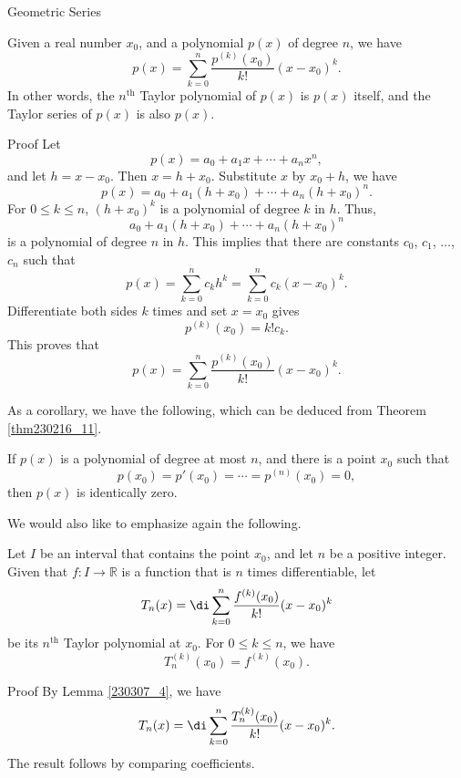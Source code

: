 \begin{example}[label=230305_16]{Geometric Series}
\begin{example}[label=230304_9]{}
\begin{example}{}
\begin{lemma}[label=230307_4]{}
Given a real number $x_0$, and a polynomial $p(x)$ of degree $n$, we have
\[p(x)=\sum_{k=0}^n\frac{p^{(k)}(x_0)}{k!}(x-x_0)^k.\]In other words, the $n^{\text{th}}$ Taylor polynomial of $p(x)$ is $p(x)$ itself, and the Taylor series of $p(x)$ is also $p(x)$.
\end{lemma}
\begin{myproof}{Proof}
Let
\[p(x)=a_0+a_1x+\cdots+a_nx^n,\]
and let $h=x-x_0$. Then   $x=h+x_0$. Substitute $x$ by $x_0+h$, we have
\[p(x)=a_0+a_1(h+x_0)+\cdots+a_n(h+x_0)^n.\]
For $0\leq k\leq n$, $(h+x_0)^k$ is a polynomial of degree $k$ in $h$. Thus,
\[a_0+a_1(h+x_0)+\cdots+a_n(h+x_0)^n\] 
 is a polynomial of degree $n$ in $h$. This implies that there are constants $c_0$, $c_1$, $\ldots$, $c_n$ such that
\[p(x)= \sum_{k=0}^n c_kh^k=\sum_{k=0}^nc_k(x-x_0)^k.\]
Differentiate both sides $k$ times and set $x=x_0$ gives
\[p^{(k)}(x_0)=k!c_k.\]
This proves that
\[p(x)=\sum_{k=0}^n\frac{p^{(k)}(x_0)}{k!}(x-x_0)^k.\]

\end{myproof}

As  a corollary, we have the following, which can be deduced from Theorem \ref{thm230216_11}.
\begin{corollary}[label=230307_18]{}
If $p(x)$ is a polynomial of degree at most $n$, and there is a point $x_0$ such that
\[p(x_0)=p'(x_0)=\cdots =p^{(n)}(x_0)=0,\]
then $p(x)$ is identically zero.
\end{corollary} 

We would also like to emphasize again the following.
\begin{corollary}[label=230307_5]{}
Let $I$ be an interval that contains the point $x_0$, and let $n$ be a positive integer. Given that $f:I\to\mathbb{R}$   is a function that is $n$ times differentiable, let \[T_n(x)=\di\sum_{k=0}^n\frac{f^{(k)}(x_0)}{k!}(x-x_0)^k\]be its $n^{\text{th}}$ Taylor polynomial  at $x_0$. For $0\leq k\leq n$, we have
\[T_n^{(k)}(x_0)=f^{(k)}(x_0).\]
\end{corollary}
\begin{myproof}{Proof}
By Lemma \ref{230307_4}, we have
\[ T_n(x)=\di\sum_{k=0}^n\frac{T_n^{(k)}(x_0)}{k!}(x-x_0)^k.\]
The result follows by comparing coefficients.
\end{myproof}


\end{example}
\end{example}
\end{example}
